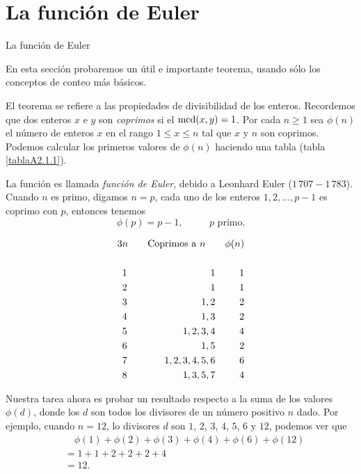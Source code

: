 
\appendix
\setcounter{chapter}{2}
\renewcommand{\thechapter}{\Alph{chapter}}
 \chapter[La función de Euler]{La función de Euler}


 \begin{section}{La función de Euler} \label{A2.1 }


 En esta sección probaremos un útil e importante teorema, usando sólo
 los conceptos de conteo más básicos.

 El teorema se refiere a las
 propiedades de divisibilidad de los enteros. Recordemos que dos enteros $x$ e
 $y$ son {\it coprimos} si el $\operatorname{mcd}(x,y) = 1$. Por cada $n \ge 1$ sea
 $\phi(n)$ el número de
 enteros $x$ en el rango $1 \le x \le n$ tal que $x$ y $n$ son coprimos.
 Podemos
 calcular los primeros valores de $\phi(n)$ haciendo una tabla (tabla
 \ref{tablaA2.1.1}).

La función es llamada {\em función de Euler}, debido a Leonhard
Euler   ($1\,707-1\,783$). Cuando $n$ es primo,
digamos $n=p$, cada uno de los enteros $1,2,\ldots,p-1$ es coprimo
con $p$, entonces tenemos
$$
\phi(p)=p-1,\qquad\text{ $p$ primo.}
$$




 \begin{table}

 \begin{alignat*}3
 &n& \text{\quad Coprimos a $n$\quad }& &\phi(n)&\\
&&&&&\\
 &1&1&&1& \\
 &2&1&&1& \\
 &3&1,2&&2& \\
 &4&1,3&&2& \\
 &5&1,2,3,4&&4& \\
 &6&1,5&&2& \\
 &7&1,2,3,4,5,6&&6& \\
 &8&1,3,5,7&&4&
 \end{alignat*}

\caption{} \label{tablaA2.1.1}
\end{table}




Nuestra tarea ahora es probar un resultado respecto a la suma de
los valores $\phi(d)$, donde los $d$ son todos los divisores de un
número positivo $n$ dado. Por ejemplo, cuando $n=12$, lo divisores
$d$ son $1$, $2$, $3$, $4$, $5$, $6$ y $12$, podemos ver que
\begin{align*}
&\quad\phi(1)+\phi(2)+\phi(3)+\phi(4)+\phi(6)+\phi(12)\\
&= 1 +1+2+2+2+4 \\
&=12.
\end{align*}


\end{section}

